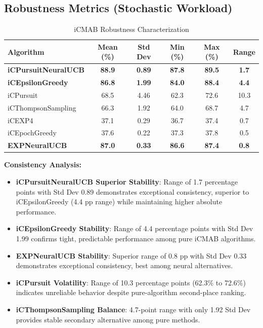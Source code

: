 \documentclass[12pt,a4paper]{article}
\newcommand{\secondarytext}[1]{\textcolor{secondaryblue}{\textbf{#1}}}
\newcommand{\success}[1]{\textcolor{accentgreen}{\textbf{#1}}}
\newcommand{\warning}[1]{\textcolor{warningred}{\textbf{#1}}}
\newcommand{\legacy}[1]{\textcolor{legacycolor}{\textbf{#1}}}
\newcommand{\neural}[1]{\textcolor{neuralcolor}{\textbf{#1}}}
\begin{document}
\subsection{Robustness Metrics (Stochastic Workload)}

\begin{table}[H]
\centering
\caption{iCMAB Robustness Characterization}
\label{tab:robustness}
\begin{tabular}{@{}lccccc@{}}
\toprule
\textbf{Algorithm} & \textbf{Mean (\%)} & \textbf{Std Dev} & \textbf{Min (\%)} & \textbf{Max (\%)} & \textbf{Range} \\
\midrule
\neural{iCPursuitNeuralUCB}   & \neural{88.9} & \neural{0.89} & \neural{87.8} & \neural{89.5} & \neural{1.7} \\
\success{iCEpsilonGreedy}   & \success{86.8} & \success{1.99} & \success{84.0} & \success{88.4} & \success{4.4} \\
iCPursuit                   & 68.5 & 4.46 & 62.3 & 72.6 & 10.3 \\
iCThompsonSampling          & 66.3 & 1.92 & 64.0 & 68.7 & 4.7 \\
iCEXP4                      & 37.1 & 0.29 & 36.7 & 37.4 & 0.7 \\
iCEpochGreedy               & 37.6 & 0.22 & 37.3 & 37.8 & 0.5 \\
\legacy{EXPNeuralUCB}       & \legacy{87.0} & \legacy{0.33} & \legacy{86.6} & \legacy{87.4} & \legacy{0.8} \\
\bottomrule
\end{tabular}
\end{table}

\textbf{Consistency Analysis:}
\begin{itemize}
\item \neural{iCPursuitNeuralUCB Superior Stability}: Range of 1.7 percentage points with Std Dev 0.89 demonstrates exceptional consistency, superior to iCEpsilonGreedy (4.4 pp range) while maintaining higher absolute performance.
\item \success{iCEpsilonGreedy Stability}: Range of 4.4 percentage points with Std Dev 1.99 confirms tight, predictable performance among pure iCMAB algorithms.
\item \legacy{EXPNeuralUCB Stability}: Superior range of 0.8 pp with Std Dev 0.33 demonstrates exceptional consistency, best among neural alternatives.
\item \warning{iCPursuit Volatility}: Range of 10.3 percentage points (62.3\% to 72.6\%) indicates unreliable behavior despite pure-algorithm second-place ranking.
\item \secondarytext{iCThompsonSampling Balance}: 4.7-point range with only 1.92 Std Dev provides stable secondary alternative among pure methods.
\end{itemize}
\end{document}
